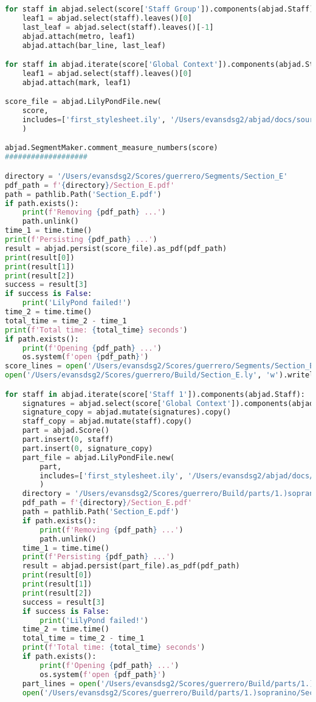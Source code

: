 \begin{lstlisting}[language=Python, caption=Invocation Source Code]
for staff in abjad.select(score['Staff Group']).components(abjad.Staff):
    leaf1 = abjad.select(staff).leaves()[0]
    last_leaf = abjad.select(staff).leaves()[-1]
    abjad.attach(metro, leaf1)
    abjad.attach(bar_line, last_leaf)

for staff in abjad.iterate(score['Global Context']).components(abjad.Staff):
    leaf1 = abjad.select(staff).leaves()[0]
    abjad.attach(mark, leaf1)

score_file = abjad.LilyPondFile.new(
    score,
    includes=['first_stylesheet.ily', '/Users/evansdsg2/abjad/docs/source/_stylesheets/abjad.ily'],
    )

abjad.SegmentMaker.comment_measure_numbers(score)
###################

directory = '/Users/evansdsg2/Scores/guerrero/Segments/Section_E'
pdf_path = f'{directory}/Section_E.pdf'
path = pathlib.Path('Section_E.pdf')
if path.exists():
    print(f'Removing {pdf_path} ...')
    path.unlink()
time_1 = time.time()
print(f'Persisting {pdf_path} ...')
result = abjad.persist(score_file).as_pdf(pdf_path)
print(result[0])
print(result[1])
print(result[2])
success = result[3]
if success is False:
    print('LilyPond failed!')
time_2 = time.time()
total_time = time_2 - time_1
print(f'Total time: {total_time} seconds')
if path.exists():
    print(f'Opening {pdf_path} ...')
    os.system(f'open {pdf_path}')
score_lines = open('/Users/evansdsg2/Scores/guerrero/Segments/Section_E/Section_E.ly').readlines()
open('/Users/evansdsg2/Scores/guerrero/Build/Section_E.ly', 'w').writelines(score_lines[15:-1])

for staff in abjad.iterate(score['Staff 1']).components(abjad.Staff):
    signatures = abjad.select(score['Global Context']).components(abjad.Staff)
    signature_copy = abjad.mutate(signatures).copy()
    staff_copy = abjad.mutate(staff).copy()
    part = abjad.Score()
    part.insert(0, staff)
    part.insert(0, signature_copy)
    part_file = abjad.LilyPondFile.new(
        part,
        includes=['first_stylesheet.ily', '/Users/evansdsg2/abjad/docs/source/_stylesheets/abjad.ily'],
        )
    directory = '/Users/evansdsg2/Scores/guerrero/Build/parts/1.)sopranino'
    pdf_path = f'{directory}/Section_E.pdf'
    path = pathlib.Path('Section_E.pdf')
    if path.exists():
        print(f'Removing {pdf_path} ...')
        path.unlink()
    time_1 = time.time()
    print(f'Persisting {pdf_path} ...')
    result = abjad.persist(part_file).as_pdf(pdf_path)
    print(result[0])
    print(result[1])
    print(result[2])
    success = result[3]
    if success is False:
        print('LilyPond failed!')
    time_2 = time.time()
    total_time = time_2 - time_1
    print(f'Total time: {total_time} seconds')
    if path.exists():
        print(f'Opening {pdf_path} ...')
        os.system(f'open {pdf_path}')
    part_lines = open('/Users/evansdsg2/Scores/guerrero/Build/parts/1.)sopranino/Section_E.ly').readlines()
    open('/Users/evansdsg2/Scores/guerrero/Build/parts/1.)sopranino/Section_E.ly', 'w').writelines(part_lines[15:-1])


\end{lstlisting}
